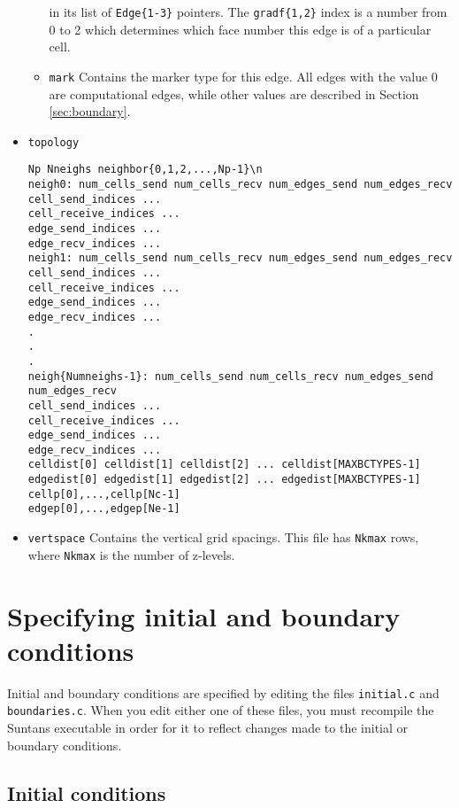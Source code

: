 \documentclass[12pt,oneside]{article}
\begin{document}
\begin{itemize}
\begin{itemize}
in its list of \verb+Edge{1-3}+ pointers.  The \verb+gradf{1,2}+ index is a number from 
0 to 2 which determines which face number this edge is of a particular cell.
\item \verb+mark+ Contains the marker type for this edge.  All edges with the value 0 are
computational edges, while other values are described in Section \ref{sec:boundary}.
\end{itemize}
\item \verb+topology+
\begin{verbatim}
Np Nneighs neighbor{0,1,2,...,Np-1}\n
neigh0: num_cells_send num_cells_recv num_edges_send num_edges_recv
cell_send_indices ...
cell_receive_indices ...
edge_send_indices ...
edge_recv_indices ...
neigh1: num_cells_send num_cells_recv num_edges_send num_edges_recv
cell_send_indices ...
cell_receive_indices ...
edge_send_indices ...
edge_recv_indices ...
.
.
.
neigh{Numneighs-1}: num_cells_send num_cells_recv num_edges_send num_edges_recv
cell_send_indices ...
cell_receive_indices ...
edge_send_indices ...
edge_recv_indices ...
celldist[0] celldist[1] celldist[2] ... celldist[MAXBCTYPES-1]
edgedist[0] edgedist[1] edgedist[2] ... edgedist[MAXBCTYPES-1]
cellp[0],...,cellp[Nc-1]
edgep[0],...,edgep[Ne-1]
\end{verbatim}
\item \verb+vertspace+ Contains the vertical grid spacings.  This file has \verb+Nkmax+ rows,
where \verb+Nkmax+ is the number of z-levels.
\end{itemize}

\section{Specifying initial and boundary conditions} 

Initial and boundary conditions are specified by editing the files \verb+initial.c+ and \verb+boundaries.c+.  When you
edit either one of these files, you must recompile the Suntans executable in order for it to reflect changes made
to the initial or boundary conditions.

\subsection{Initial conditions}
\end{document}
